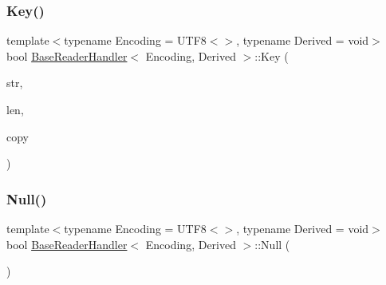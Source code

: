 \mbox{\label{structBaseReaderHandler_abc50b2e7e411b7b731715e05cd01e2eb}} 
\subsubsection{\texorpdfstring{Key()}{Key()}}
{\footnotesize\ttfamily template$<$typename Encoding = U\+T\+F8$<$$>$, typename Derived = void$>$ \\
bool \hyperlink{structBaseReaderHandler}{Base\+Reader\+Handler}$<$ Encoding, Derived $>$\+::Key (\begin{DoxyParamCaption}\item[{const \hyperlink{structBaseReaderHandler_a8302c755dd3560c8c5bac99162c28214}{Ch} $\ast$}]{str,  }\item[{\hyperlink{rapidjson_8h_a5ed6e6e67250fadbd041127e6386dcb5}{Size\+Type}}]{len,  }\item[{bool}]{copy }\end{DoxyParamCaption})\hspace{0.3cm}{\ttfamily [inline]}}

\mbox{\label{structBaseReaderHandler_ae2ebbde4628bf3659ddc5d18520935f5}} 
\subsubsection{\texorpdfstring{Null()}{Null()}}
{\footnotesize\ttfamily template$<$typename Encoding = U\+T\+F8$<$$>$, typename Derived = void$>$ \\
bool \hyperlink{structBaseReaderHandler}{Base\+Reader\+Handler}$<$ Encoding, Derived $>$\+::Null (\begin{DoxyParamCaption}{ }\end{DoxyParamCaption})\hspace{0.3cm}{\ttfamily [inline]}}

\mbox{\label{structBaseReaderHandler_a9ed0d83d5e6c8f5e4b32ca3735ff0bb7}} 
